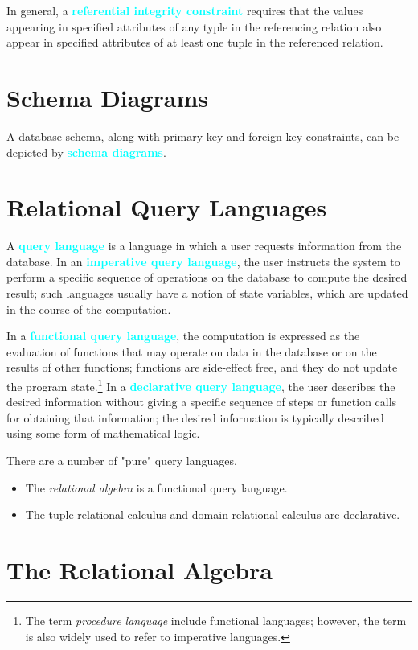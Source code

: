 \documentclass[a4paper,12pt,twoside,openany]{book}
\newcommand{\textcy}[1]{\textbf{\textcolor{cyan}{#1}}}
\begin{document}
In general, a \textcy{referential integrity constraint} requires that the values appearing in specified attributes of any typle in the referencing relation also appear in specified attributes of at least one tuple in the referenced relation.

\section{Schema Diagrams}

A database schema, along with primary key and foreign-key constraints, can be depicted by \textcy{schema diagrams}.

\section{Relational Query Languages}

A \textcy{query language} is a language in which a user requests information from the database. In an \textcy{imperative query language}, the user instructs the system to perform a specific sequence of operations on the database to compute the desired result; such languages usually have a notion of state variables, which are updated in the course of the computation.

In a \textcy{functional query language}, the computation is expressed as the evaluation of functions that may operate on data in the database or on the results of other functions; functions are side-effect free, and they do not update the program state.\footnote{The term \textit{procedure language} include functional languages; however, the term is also widely used to refer to imperative languages.} In a \textcy{declarative query language}, the user describes the desired information without giving a specific sequence of steps or function calls for obtaining that information; the desired information is typically described using some form of mathematical logic.

There are a number of "pure" query languages.
\begin{itemize}
    \item The \textit{relational algebra} is a functional query language.
    \item The tuple relational calculus and domain relational calculus are declarative.
\end{itemize}

\section{The Relational Algebra}
\end{document}
